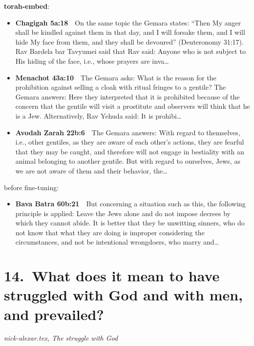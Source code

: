 \documentclass[11pt,a4paper]{article}
\begin{document}
{\color{quiet}\small\textbf{torah-embed}:}
\begin{itemize}[leftmargin=1.2em,itemsep=3pt]
\item {\color{ref}\textbf{Chagigah 5a:18}}\ \ On the same topic the Gemara states: “Then My anger shall be kindled against them in that day, and I will forsake them, and I will hide My face from them, and they shall be devoured” (Deuteronomy 31:17). Rav Bardela bar Tavyumei said that Rav said: Anyone who is not subject to His hiding of the face, i.e., whose prayers are inva\ldots
\item {\color{ref}\textbf{Menachot 43a:10}}\ \ The Gemara asks: What is the reason for the prohibition against selling a cloak with ritual fringes to a gentile? The Gemara answers: Here they interpreted that it is prohibited because of the concern that the gentile will visit a prostitute and observers will think that he is a Jew. Alternatively, Rav Yehuda said: It is prohibi\ldots
\item {\color{ref}\textbf{Avodah Zarah 22b:6}}\ \ The Gemara answers: With regard to themselves, i.e., other gentiles, as they are aware of each other’s actions, they are fearful that they may be caught, and therefore will not engage in bestiality with an animal belonging to another gentile. But with regard to ourselves, Jews, as we are not aware of them and their behavior, the\ldots
\end{itemize}
{\color{quiet}\small before fine-tuning:}
\begin{itemize}[leftmargin=1.2em]
\item {\color{ref}\textbf{Bava Batra 60b:21}}\ \ But concerning a situation such as this, the following principle is applied: Leave the Jews alone and do not impose decrees by which they cannot abide. It is better that they be unwitting sinners, who do not know that what they are doing is improper considering the circumstances, and not be intentional wrongdoers, who marry and\ldots
\end{itemize}

\section*{14.\ What does it mean to have struggled with God and with men, and prevailed?}
{\color{quiet}\small\textit{nick-alexar.tex, The struggle with God}}
\end{document}
